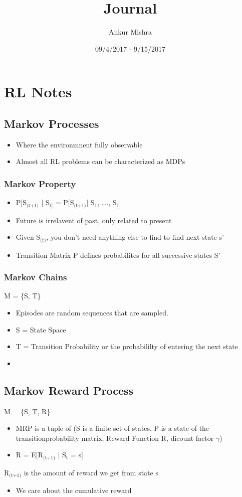 \documentclass[11pt]{article}
\author{Ankur Mishra}
\date{09/4/2017 - 9/15/2017}
\title{Journal}
\begin{document}
\maketitle
\tableofcontents

\section{RL Notes}
\label{sec-1}
\subsection{Markov Processes}
\label{sec-1-1}
\begin{itemize}
\item Where the environmnent fully observable
\item Almost all RL problems can be characterized as MDPs
\end{itemize}
\subsubsection{Markov Property}
\label{sec-1-1-1}
\begin{itemize}
\item P[S$_{\text{(t+1)}}$ | S$_{\text{t]}}$ = P[S$_{\text{(t+1)}}$| S$_{\text{1}}$, \ldots{}., S$_{\text{t]}}$
\item Future is irrelavent of past, only related to present
\item Given S$_{\text{(t)}}$, you don't need anything else to find to find next state s'
\item Transition Matrix P defines probabilites for all successive states S'
\end{itemize}
\subsubsection{Markov Chains}
\label{sec-1-1-2}
M = \{S, T\}
\begin{itemize}
\item Episodes are random sequences that are sampled.
\item S = State Space
\item T = Transition Probability or the probabililty of entering the next state
\item 
\end{itemize}
\subsection{Markov Reward Process}
\label{sec-1-2}
M = \{S, T, R\}
\begin{itemize}
\item MRP is a tuple of (S is a finite set of states, P is a state of the transitionprobability matrix, Reward Function R, dicount factor $\gamma$)
\item R = E[R$_{\text{(t+1)}}$ | S$_{\text{t}}$ = s]
\end{itemize}
R$_{\text{(t+1)}}$ is the amount of reward we get from state s
\begin{itemize}
\item We care about the cumulative reward
\end{itemize}
\end{document}
